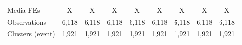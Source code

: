 {\begin{tabular}{l*{8}{c}}
Media FEs           &           X         &           X         &           X         &           X         &           X         &           X         &           X         &           X         \\
Observations        &       6,118         &       6,118         &       6,118         &       6,118         &       6,118         &       6,118         &       6,118         &       6,118         \\
Clusters (event)    &       1,921         &       1,921         &       1,921         &       1,921         &       1,921         &       1,921         &       1,921         &       1,921         \\
\hline\hline
\end{tabular}
}
